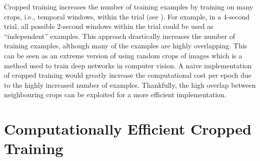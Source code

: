 Cropped training increases the number of training examples by training
on many crops, i.e., temporal windows, within the trial (see ). For example, in
a 4-second trial, all possible 2-second windows within the trial could
be used as ``independent'' examples. This approach drastically increases
the number of training examples, although many of the examples are
highly overlapping. This can be seen as an extreme version of using
random crops of images which is a method used to train deep networks in
computer vision. A naive implementation of cropped training would
greatly increase the computational cost per epoch due to the highly
increased number of examples. Thankfully, the high overlap between
neighbouring crops can be exploited for a more efficient implementation.



\section{Computationally Efficient Cropped
Training}\label{computationally-faster-cropped-training}




